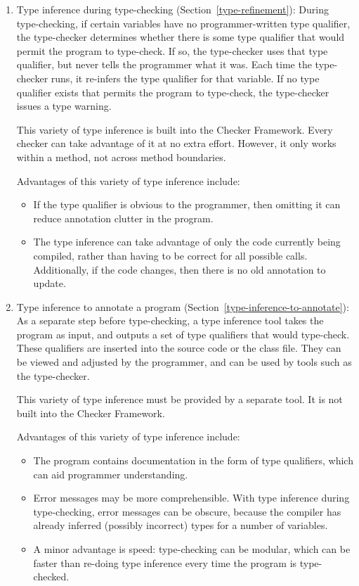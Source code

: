 \begin{enumerate}
\item
  Type inference during type-checking (Section~\ref{type-refinement}):
  During type-checking, if certain variables have no programmer-written type qualifier, the
  type-checker determines whether there is some type qualifier that would
  permit the program to type-check.  If so, the type-checker uses that type
  qualifier, but never tells the programmer what it was.  Each time the
  type-checker runs, it re-infers the type qualifier for that variable.  If
  no type qualifier exists that permits the program to type-check, the
  type-checker issues a type warning.

  This variety of type inference is built into the Checker Framework.  Every
  checker can take advantage of it at no extra effort.  However, it only
  works within a method, not across method boundaries.

  Advantages of this variety of type inference include:
  \begin{itemize}
  \item
    If the type qualifier is obvious to the programmer, then omitting it
    can reduce annotation clutter in the program.
  \item
    The type inference can take advantage of only the code currently being
    compiled, rather than having to be correct for all possible calls.
    Additionally, if the code changes, then there is no old annotation to
    update.
  \end{itemize}


\item
  Type inference to annotate a program (Section~\ref{type-inference-to-annotate}):
  As a separate step before type-checking, a type inference tool takes the
  program as input, and outputs a set of type qualifiers that would
  type-check.  These qualifiers are inserted into the source code or the
  class file.  They can be viewed and adjusted by the programmer, and can
  be used by tools such as the type-checker.

  This variety of type inference must be provided by a separate tool.  It
  is not built into the Checker Framework.

  Advantages of this variety of type inference include:
  \begin{itemize}
  \item
    The program contains documentation in the form of type qualifiers,
    which can aid programmer understanding.
  \item
    Error messages may be more comprehensible.  With type inference
    during type-checking, error messages can be obscure, because the
    compiler has already inferred (possibly incorrect) types for a number
    of variables.
  \item
    A minor advantage is speed:  type-checking can be modular, which can be
    faster than re-doing type inference every time the
    program is type-checked.
  \end{itemize}

\end{enumerate}

